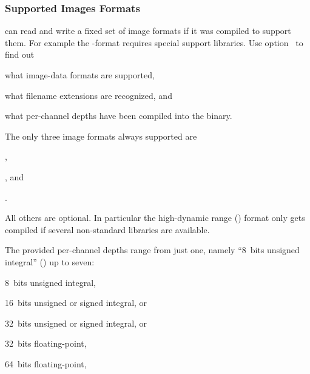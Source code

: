 \subsubsection[Image Formats]{\label{sec:image-formats}%
  Supported Images Formats}

\App{} can read and write a fixed set of image formats if it was compiled to support them.  For
example the -format requires special support libraries.  Use
option~ to find out

\begin{compactitemize}
\item
  what image-data formats are supported,

\item
  what filename extensions are recognized, and

\item
  what per-channel depths have been compiled into the \appcmd{} binary.
\end{compactitemize}

\noindent The only three image formats always supported are

\begin{compactitemize}
\item
  ,

\item
  , and

\item
  .
\end{compactitemize}

%
\noindent All others are optional.  In particular the high-dynamic range () format
 only gets compiled if several non-standard libraries are available.

The provided per-channel depths range from just one, namely ``8~bits unsigned integral''
() up to seven:

\begin{compactitemize}
\item
  8~bits unsigned integral, 

\item
  16~bits unsigned or signed integral,  or 

\item
  32~bits unsigned or signed integral,  or 

\item
  32~bits floating-point, 

\item
  64~bits floating-point, 
\end{compactitemize}


